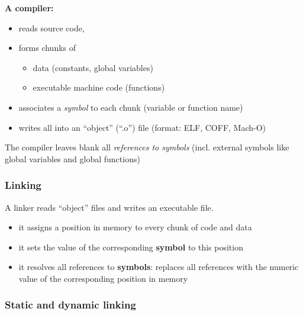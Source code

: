 \documentclass[12pt]{article}
\begin{document}
\textbf{A compiler:}

\begin{itemize}
    \item reads source code,
    \item forms chunks of
    \begin{itemize}
        \item data (constants, global variables)
        \item executable machine code (functions)
    \end{itemize}
    \item associates a \textit{symbol} to each chunk (variable or function name)
    \item writes all into an ``object'' (“.o”) file (format: ELF, COFF, Mach-O)
\end{itemize}

The compiler leaves blank all \textit{references to symbols} (incl. external symbols like global variables and global functions)


\subsubsection{Linking}

A linker reads ``object'' files and writes an executable file.

\begin{itemize}
  \item it assigns a position in memory to every chunk of code and data
  \item it sets the value of the corresponding \textbf{symbol} to this position
  \item it resolves all references to \textbf{symbols}:
  replaces all references with the numeric value of the corresponding position in memory
\end{itemize}

\subsubsection{Static and dynamic linking}
\end{document}
